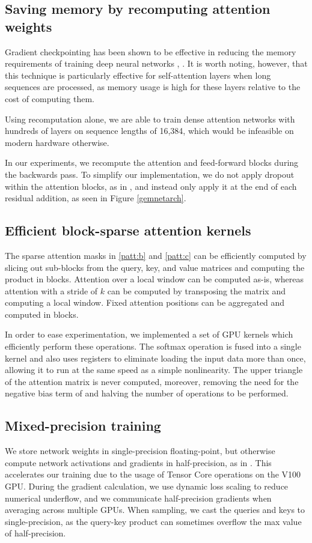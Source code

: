\subsection{Saving memory by recomputing attention weights} Gradient checkpointing has been shown to be effective in reducing the memory requirements of training deep neural networks \cite{chen2016training}, \cite{gruslys2016memory}. It is worth noting, however, that this technique is particularly effective for self-attention layers when long sequences are processed, as memory usage is high for these layers relative to the cost of computing them.

Using recomputation alone, we are able to train dense attention networks with hundreds of layers on sequence lengths of 16,384, which would be infeasible on modern hardware otherwise.

In our experiments, we recompute the attention and feed-forward blocks during the backwards pass. To simplify our implementation, we do not apply dropout within the attention blocks, as in \cite{vaswani2017attention}, and instead only apply it at the end of each residual addition, as seen in Figure \ref{gemnetarch}.

\subsection{Efficient block-sparse attention kernels} The sparse attention masks in \ref{patt:b} and \ref{patt:c} can be efficiently computed by slicing out sub-blocks from the query, key, and value matrices and computing the product in blocks. Attention over a local window can be computed as-is, whereas attention with a stride of $k$ can be computed by transposing the matrix and computing a local window. Fixed attention positions can be aggregated and computed in blocks.

In order to ease experimentation, we implemented a set of GPU kernels which efficiently perform these operations. The softmax operation is fused into a single kernel and also uses registers to eliminate loading the input data more than once, allowing it to run at the same speed as a simple nonlinearity. The upper triangle of the attention matrix is never computed, moreover, removing the need for the negative bias term of \cite{vaswani2017attention} and halving the number of operations to be performed.

\subsection{Mixed-precision training} We store network weights in single-precision floating-point, but otherwise compute network activations and gradients in half-precision, as in \cite{micikevicius2017mixed}. This accelerates our training due to the usage of Tensor Core operations on the V100 GPU. During the gradient calculation, we use dynamic loss scaling to reduce numerical underflow, and we communicate half-precision gradients when averaging across multiple GPUs. When sampling, we cast the queries and keys to single-precision, as the query-key product can sometimes overflow the max value of half-precision.

